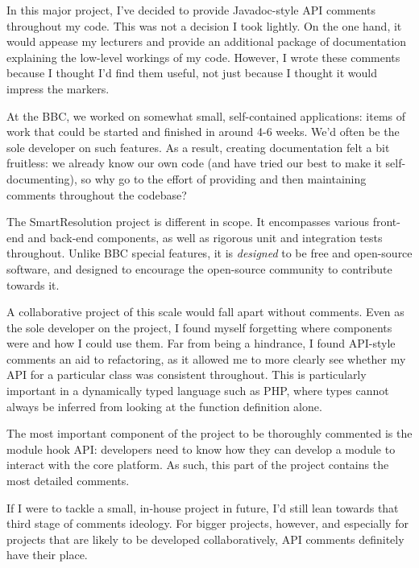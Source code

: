 In this major project, I've decided to provide Javadoc-style API comments throughout my code. This was not a decision I took lightly. On the one hand, it would appease my lecturers and provide an additional package of documentation explaining the low-level workings of my code. However, I wrote these comments because I thought I'd find them useful, not just because I thought it would impress the markers.

At the BBC, we worked on somewhat small, self-contained applications: items of work that could be started and finished in around 4-6 weeks. We'd often be the sole developer on such features. As a result, creating documentation felt a bit fruitless: we already know our own code (and have tried our best to make it self-documenting), so why go to the effort of providing and then maintaining comments throughout the codebase?

The SmartResolution project is different in scope. It encompasses various front-end and back-end components, as well as rigorous unit and integration tests throughout. Unlike BBC special features, it is \emph{designed} to be free and open-source software, and designed to encourage the open-source community to contribute towards it.

A collaborative project of this scale would fall apart without comments. Even as the sole developer on the project, I found myself forgetting where components were and how I could use them. Far from being a hindrance, I found API-style comments an aid to refactoring, as it allowed me to more clearly see whether my API for a particular class was consistent throughout. This is particularly important in a dynamically typed language such as PHP, where types cannot always be inferred from looking at the function definition alone.

The most important component of the project to be thoroughly commented is the module hook API: developers need to know how they can develop a module to interact with the core platform. As such, this part of the project contains the most detailed comments.

If I were to tackle a small, in-house project in future, I'd still lean towards that third stage of comments ideology. For bigger projects, however, and especially for projects that are likely to be developed collaboratively, API comments definitely have their place.